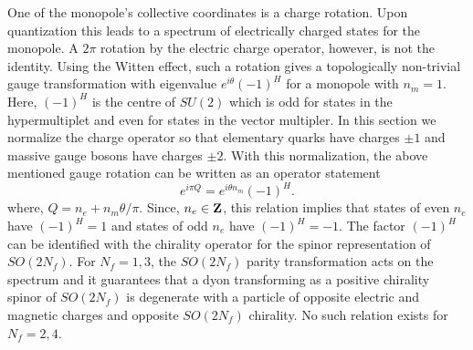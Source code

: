 One of the monopole's collective coordinates is a charge rotation.
Upon quantization this leads to a spectrum of electrically charged
states for the monopole. A $2\pi$ rotation by the electric charge
operator, however, is not the identity.  Using the Witten effect, such
a rotation gives a topologically non-trivial gauge transformation with
eigenvalue $e^{i \theta} (-1)^H$ for a monopole with $n_m = 1$. Here,
$(-1)^H$ is the centre of $SU(2)$ which is odd for states in the
hypermultiplet and even for states in the vector multipler. In this
section we normalize the charge operator so that elementary quarks
have charges $\pm 1$ and massive gauge bosons have charges $\pm 2$. 
With this normalization, the above mentioned gauge rotation can be
written as an operator statement 
$$
e^{i \pi Q} = e^{i \theta n_m} (-1)^H.
$$
where, $Q = n_e + n_m \theta/\pi$. Since, $n_e \in {\bf Z}$, this
relation implies that states of even $n_e$ have $(-1)^H = 1$ and
states of odd $n_e$ have $(-1)^H = -1$. The factor $(-1)^H$ can be
identified with the chirality operator for the spinor representation
of $SO(2N_f)$.  For $N_f = 1,3$, the $SO(2N_f)$ parity transformation 
acts on the spectrum and it guarantees that a dyon transforming as a
positive chirality spinor of $SO(2N_f)$ is degenerate with a particle
of opposite electric and magnetic charges and opposite $SO(2N_f)$
chirality.  No such relation exists for $N_f = 2,4$.

